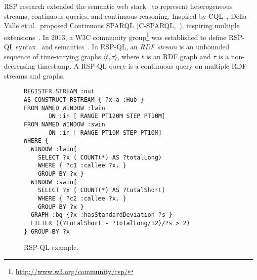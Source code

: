 \sloppy RSP research extended the
semantic web stack~\cite{DBLP:books/daglib/0036180} to represent
heterogeneous streams, continuous queries, and continuous
reasoning. Inspired by CQL~\cite{arasu_widom_2004}, Della Valle et
al.\ proposed Continuous SPARQL
(\textsf{C-SPARQL},~\cite{DBLP:conf/fis/ValleCBBC08}), inspiring multiple
extensions~\cite{DBLP:journals/semweb/AnicicRFS12,Calbimonte2010,LePhuoc2012c}.
In 2013, a W3C community
group\footnote{\url{http://www.w3.org/community/rsp/}} was established
to define \textsf{RSP-QL} syntax~\cite{DBLP:conf/esws/DellAglioCVC15}
and semantics~\cite{DBLP:journals/ijswis/DellAglioVCC14}.
In RSP-QL, an \textit{RDF stream} is an unbounded sequence of
time-varying graphs $\langle t,\tau\rangle$, where $t$ is an RDF graph
and $\tau$ is a non-decreasing timestamp.  A RSP-QL query is a
continuous query on multiple RDF streams and graphs.  

\begin{figure}[!h]
\begin{lstlisting}[language=rsp-ql]
REGISTER STREAM :out
AS CONSTRUCT RSTREAM { ?x a :Hub }
FROM NAMED WINDOW :lwin
       ON :in [ RANGE PT120M STEP PT10M]
FROM NAMED WINDOW :swin
       ON :in [ RANGE PT10M STEP PT10M]
WHERE {
  WINDOW :lwin{
    SELECT ?x ( COUNT(*) AS ?totalLong)
    WHERE { ?c1 :callee ?x. }
    GROUP BY ?x }
  WINDOW :swin{
    SELECT ?x ( COUNT(*) AS ?totalShort)
    WHERE { ?c2 :callee ?x. }
    GROUP BY ?x }
  GRAPH :bg {?x :hasStandardDeviation ?s }
  FILTER ((?totalShort - ?totalLong/12)/?s > 2)
} GROUP BY ?x
\end{lstlisting}
\vspace*{-4mm}
\caption{\label{fig:rspql}RSP-QL example.}
\end{figure}

